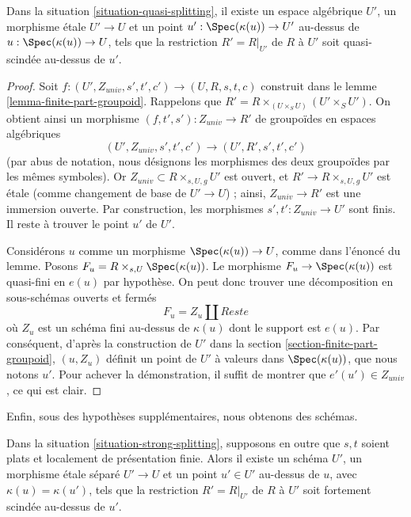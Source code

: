 \begin{lemma}
\label{lemma-quasi-splitting}
Dans la situation \ref{situation-quasi-splitting},
il existe un espace algébrique $U'$, un morphisme \'etale
$U' \to U$ et un point $u' : \Spec(\kappa(u)) \to U'$
au-dessus de $u : \Spec(\kappa(u)) \to U$,
tels que la restriction $R' = R|_{U'}$ de $R$ à $U'$
soit quasi-scindée au-dessus de $u'$.
\end{lemma}

\begin{proof}
Soit $f : (U', Z_{univ}, s', t', c') \to (U, R, s, t, c)$ construit dans le
lemme \ref{lemma-finite-part-groupoid}.
Rappelons que $R' = R \times_{(U \times_S U)} (U' \times_S U')$.
On obtient ainsi un morphisme $(f, t', s') : Z_{univ} \to R'$ de groupoïdes
en espaces algébriques
$$
(U', Z_{univ}, s', t', c') \to (U', R', s', t', c')
$$
(par abus de notation, nous désignons les morphismes des deux groupoïdes
par les mêmes symboles). Or $Z_{univ} \subset R \times_{s, U, g} U'$ est ouvert,
et $R' \to R \times_{s, U, g} U'$ est \'etale (comme changement de base
de $U' \to U$) ; ainsi, $Z_{univ} \to R'$ est une immersion ouverte.
Par construction, les morphismes $s', t' : Z_{univ} \to U'$ sont finis.
Il reste à trouver le point $u'$ de $U'$.

\medskip\noindent
Considérons $u$ comme un morphisme $\Spec(\kappa(u)) \to U$, comme dans
l'énoncé du lemme. Posons $F_u = R \times_{s, U} \Spec(\kappa(u))$.
Le morphisme $F_u \to \Spec(\kappa(u))$ est quasi-fini en $e(u)$
par hypothèse. On peut donc trouver une décomposition en sous-schémas
ouverts et fermés
$$
F_u = Z_u \amalg Reste
$$
où $Z_u$ est un schéma fini au-dessus de $\kappa(u)$ dont le support est $e(u)$.
Par conséquent, d'après la construction de $U'$ dans la
section \ref{section-finite-part-groupoid},
$(u, Z_u)$ définit un point de $U'$ à valeurs dans
$\Spec(\kappa(u))$, que nous notons $u'$. Pour achever la démonstration,
il suffit de montrer que $e'(u') \in Z_{univ}$, ce qui est clair.
\end{proof}

\noindent
Enfin, sous des hypothèses supplémentaires, nous obtenons des schémas.

\begin{lemma}
\label{lemma-strong-splitting-scheme}
Dans la situation \ref{situation-strong-splitting}, supposons en outre que
$s, t$ soient plats et localement de présentation finie.
Alors il existe un schéma $U'$, un morphisme \'etale séparé
$U' \to U$ et un point $u' \in U'$
au-dessus de $u$, avec $\kappa(u) = \kappa(u')$,
tels que la restriction $R' = R|_{U'}$ de $R$ à $U'$
soit fortement scindée au-dessus de $u'$.
\end{lemma}

